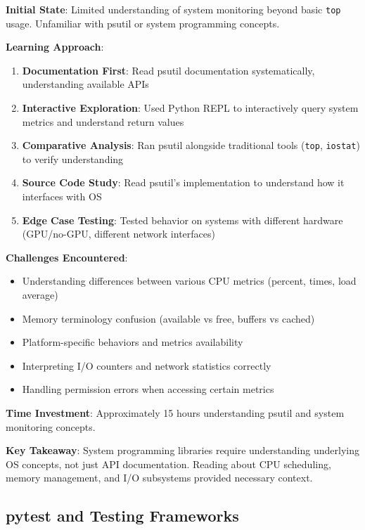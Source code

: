 \documentclass[12pt,a4paper,oneside]{report}
\begin{document}
\textbf{Initial State}: Limited understanding of system monitoring beyond basic \texttt{top} usage. Unfamiliar with psutil or system programming concepts.

\textbf{Learning Approach}:

\begin{enumerate}
    \item \textbf{Documentation First}: Read psutil documentation systematically, understanding available APIs
    \item \textbf{Interactive Exploration}: Used Python REPL to interactively query system metrics and understand return values
    \item \textbf{Comparative Analysis}: Ran psutil alongside traditional tools (\texttt{top}, \texttt{iostat}) to verify understanding
    \item \textbf{Source Code Study}: Read psutil's implementation to understand how it interfaces with OS
    \item \textbf{Edge Case Testing}: Tested behavior on systems with different hardware (GPU/no-GPU, different network interfaces)
\end{enumerate}

\textbf{Challenges Encountered}:
\begin{itemize}
    \item Understanding differences between various CPU metrics (percent, times, load average)
    \item Memory terminology confusion (available vs free, buffers vs cached)
    \item Platform-specific behaviors and metrics availability
    \item Interpreting I/O counters and network statistics correctly
    \item Handling permission errors when accessing certain metrics
\end{itemize}

\textbf{Time Investment}: Approximately 15 hours understanding psutil and system monitoring concepts.

\textbf{Key Takeaway}: System programming libraries require understanding underlying OS concepts, not just API documentation. Reading about CPU scheduling, memory management, and I/O subsystems provided necessary context.

\subsection{pytest and Testing Frameworks}
\end{document}
